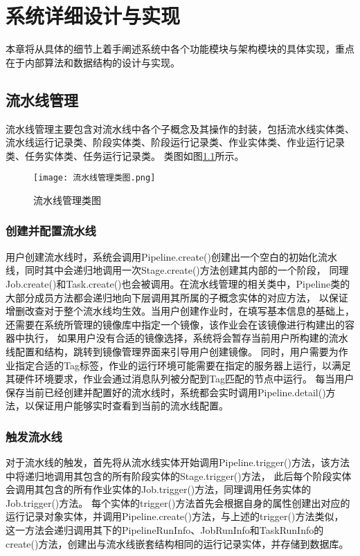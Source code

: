 
\chapter{系统详细设计与实现}
本章将从具体的细节上着手阐述系统中各个功能模块与架构模块的具体实现，重点在于内部算法和数据结构的设计与实现。

\section{流水线管理}
流水线管理主要包含对流水线中各个子概念及其操作的封装，包括流水线实体类、流水线运行记录类、阶段实体类、阶段运行记录类、作业实体类、作业运行记录类、任务实体类、任务运行记录类。
类图如图\ref{fig:流水线管理类图}所示。
\begin{figure}[h]
  \centering
  \texttt{[image: 流水线管理类图.png]}
  \caption{流水线管理类图}
  \label{fig:流水线管理类图}
\end{figure}

\subsection{创建并配置流水线}

用户创建流水线时，系统会调用Pipeline.create()创建出一个空白的初始化流水线，同时其中会递归地调用一次Stage.create()方法创建其内部的一个阶段，
同理Job.create()和Task.create()也会被调用。在流水线管理的相关类中，Pipeline类的大部分成员方法都会递归地向下层调用其所属的子概念实体的对应方法，
以保证增删改查对于整个流水线均生效。当用户创建作业时，在填写基本信息的基础上，还需要在系统所管理的镜像库中指定一个镜像，该作业会在该镜像进行构建出的容器中执行，
如果用户没有合适的镜像选择，系统将会暂存当前用户所构建的流水线配置和结构，跳转到镜像管理界面来引导用户创建镜像。
同时，用户需要为作业指定合适的Tag标签，作业的运行环境可能需要在指定的服务器上运行，以满足其硬件环境要求，作业会通过消息队列被分配到Tag匹配的节点中运行。
每当用户保存当前已经创建并配置好的流水线时，系统都会实时调用Pipeline.detail()方法，以保证用户能够实时查看到当前的流水线配置。

\subsection{触发流水线}

对于流水线的触发，首先将从流水线实体开始调用Pipeline.trigger()方法，该方法中将递归地调用其包含的所有阶段实体的Stage.trigger()方法，
此后每个阶段实体会调用其包含的所有作业实体的Job.trigger()方法，同理调用任务实体的Job.trigger()方法。
每个实体的trigger()方法首先会根据自身的属性创建出对应的运行记录对象实体，并调用Pipeline.create()方法，与上述的trigger()方法类似，
这一方法会递归调用其下的PipelineRunInfo、JobRunInfo和TaskRunInfo的create()方法，创建出与流水线嵌套结构相同的运行记录实体，并存储到数据库。

